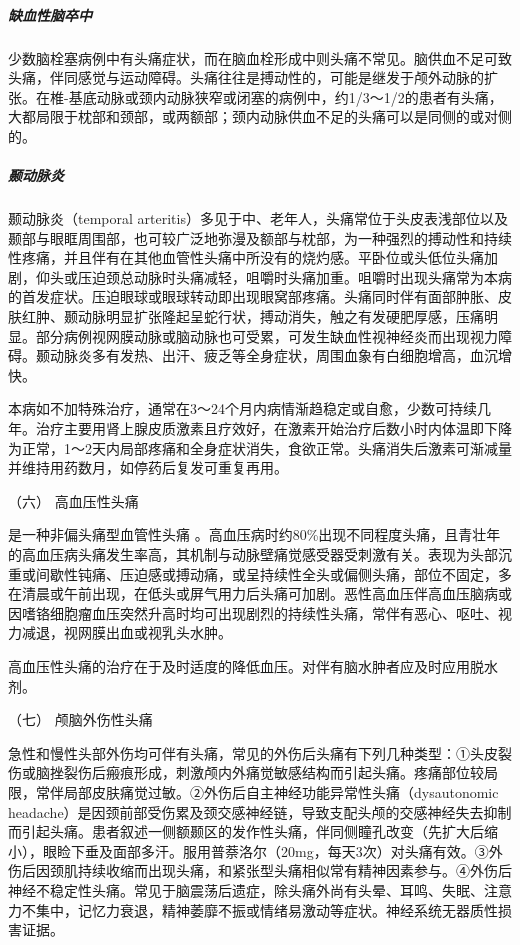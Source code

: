 \subparagraph{缺血性脑卒中}

少数脑栓塞病例中有头痛症状，而在脑血栓形成中则头痛不常见。脑供血不足可致头痛，伴同感觉与运动障碍。头痛往往是搏动性的，可能是继发于颅外动脉的扩张。在椎-基底动脉或颈内动脉狭窄或闭塞的病例中，约1/3～1/2的患者有头痛，大都局限于枕部和颈部，或两额部；颈内动脉供血不足的头痛可以是同侧的或对侧的。

\subparagraph{颞动脉炎}

颞动脉炎（temporal
arteritis）多见于中、老年人，头痛常位于头皮表浅部位以及颞部与眼眶周围部，也可较广泛地弥漫及额部与枕部，为一种强烈的搏动性和持续性疼痛，并且伴有在其他血管性头痛中所没有的烧灼感。平卧位或头低位头痛加剧，仰头或压迫颈总动脉时头痛减轻，咀嚼时头痛加重。咀嚼时出现头痛常为本病的首发症状。压迫眼球或眼球转动即出现眼窝部疼痛。头痛同时伴有面部肿胀、皮肤红肿、颞动脉明显扩张隆起呈蛇行状，搏动消失，触之有发硬肥厚感，压痛明显。部分病例视网膜动脉或脑动脉也可受累，可发生缺血性视神经炎而出现视力障碍。颞动脉炎多有发热、出汗、疲乏等全身症状，周围血象有白细胞增高，血沉增快。

本病如不加特殊治疗，通常在3～24个月内病情渐趋稳定或自愈，少数可持续几年。治疗主要用肾上腺皮质激素且疗效好，在激素开始治疗后数小时内体温即下降为正常，1～2天内局部疼痛和全身症状消失，食欲正常。头痛消失后激素可渐减量并维持用药数月，如停药后复发可重复再用。

\hypertarget{text00020.htmlux5cux23CHP1-7-4-6}{}
（六） 高血压性头痛

是一种非偏头痛型血管性头痛
。高血压病时约80\%出现不同程度头痛，且青壮年的高血压病头痛发生率高，其机制与动脉壁痛觉感受器受刺激有关。表现为头部沉重或间歇性钝痛、压迫感或搏动痛，或呈持续性全头或偏侧头痛，部位不固定，多在清晨或午前出现，在低头或屏气用力后头痛可加剧。恶性高血压伴高血压脑病或因嗜铬细胞瘤血压突然升高时均可出现剧烈的持续性头痛，常伴有恶心、呕吐、视力减退，视网膜出血或视乳头水肿。

高血压性头痛的治疗在于及时适度的降低血压。对伴有脑水肿者应及时应用脱水剂。

\hypertarget{text00020.htmlux5cux23CHP1-7-4-7}{}
（七） 颅脑外伤性头痛

急性和慢性头部外伤均可伴有头痛，常见的外伤后头痛有下列几种类型：①头皮裂伤或脑挫裂伤后瘢痕形成，刺激颅内外痛觉敏感结构而引起头痛。疼痛部位较局限，常伴局部皮肤痛觉过敏。②外伤后自主神经功能异常性头痛（dysautonomic
headache）是因颈前部受伤累及颈交感神经链，导致支配头颅的交感神经失去抑制而引起头痛。患者叙述一侧额颞区的发作性头痛，伴同侧瞳孔改变（先扩大后缩小），眼睑下垂及面部多汗。服用普萘洛尔（20mg，每天3次）对头痛有效。③外伤后因颈肌持续收缩而出现头痛，和紧张型头痛相似常有精神因素参与。④外伤后神经不稳定性头痛。常见于脑震荡后遗症，除头痛外尚有头晕、耳鸣、失眠、注意力不集中，记忆力衰退，精神萎靡不振或情绪易激动等症状。神经系统无器质性损害证据。

